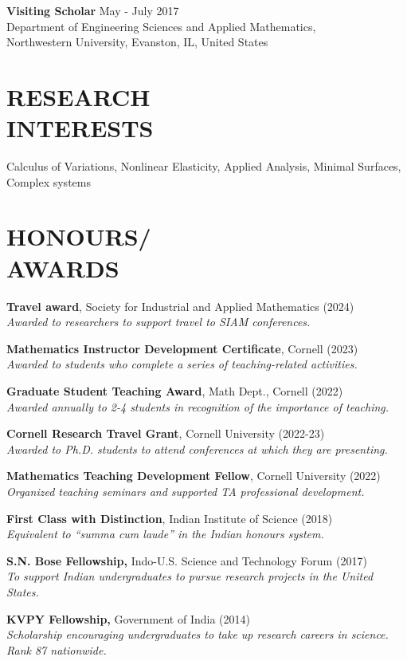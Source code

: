 \documentclass[margin]{res} %
\begin{document}
\begin{resume}
\textbf{Visiting Scholar} \hfill May - July 2017\\
Department of Engineering Sciences and Applied Mathematics,\\
Northwestern University, Evanston, IL, United States

\section{RESEARCH \\ INTERESTS} 

Calculus of Variations, Nonlinear Elasticity, Applied Analysis, Minimal Surfaces, Complex systems 
 
\section{HONOURS/\\AWARDS}
{\bf Travel award}, Society for Industrial and Applied Mathematics (2024)\\
\textit{Awarded to researchers to support travel to SIAM conferences.}

{\bf Mathematics Instructor Development Certificate}, Cornell (2023)\\
\textit{Awarded to students who complete a series of teaching-related activities.}

{\bf Graduate Student Teaching Award}, Math Dept., Cornell (2022)\\
\textit{Awarded annually to 2-4 students in recognition of the importance of teaching. }

{\bf Cornell Research Travel Grant}, Cornell University (2022-23)\\
\textit{Awarded to Ph.D. students to attend conferences at which they are presenting.}

{\bf Mathematics Teaching Development Fellow}, Cornell University (2022)\\
\textit{Organized teaching seminars and supported TA professional development.}

{\bf First Class with Distinction}, Indian Institute of Science (2018)\\
\textit{Equivalent to ``summa cum laude'' in the Indian honours system.}

{\bf S.N. Bose Fellowship,} Indo-U.S. Science and Technology Forum (2017)\\
\textit{To support Indian undergraduates to pursue research projects in the United States.}

{\bf KVPY Fellowship,} Government of India (2014)\\
\textit{Scholarship encouraging undergraduates to take up research careers in science. Rank 87 nationwide.}


\end{resume}
\end{document}

